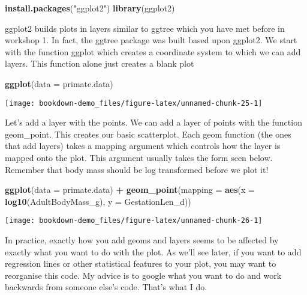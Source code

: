 \documentclass[]{book}
\newenvironment{Shaded}{\begin{snugshade}}{\end{snugshade}}
\newcommand{\KeywordTok}[1]{\textcolor[rgb]{0.13,0.29,0.53}{\textbf{#1}}}
\newcommand{\DataTypeTok}[1]{\textcolor[rgb]{0.13,0.29,0.53}{#1}}
\newcommand{\StringTok}[1]{\textcolor[rgb]{0.31,0.60,0.02}{#1}}
\newcommand{\OperatorTok}[1]{\textcolor[rgb]{0.81,0.36,0.00}{\textbf{#1}}}
\newcommand{\NormalTok}[1]{#1}
\begin{document}
\begin{Shaded}
\begin{Highlighting}[]
\KeywordTok{install.packages}\NormalTok{(}\StringTok{"ggplot2"}\NormalTok{)}
\KeywordTok{library}\NormalTok{(ggplot2)}
\end{Highlighting}
\end{Shaded}

ggplot2 builds plots in layers similar to ggtree which you have met
before in workshop 1. In fact, the ggtree package was built based upon
ggplot2. We start with the function ggplot which creates a coordinate
system to which we can add layers. This function alone just creates a
blank plot

\begin{Shaded}
\begin{Highlighting}[]
\KeywordTok{ggplot}\NormalTok{(}\DataTypeTok{data =}\NormalTok{ primate.data)}
\end{Highlighting}
\end{Shaded}

\begin{center}\texttt{[image: bookdown-demo\_files/figure-latex/unnamed-chunk-25-1]} \end{center}

Let's add a layer with the points. We can add a layer of points with the
function geom\_point. This creates our basic scatterplot. Each geom
function (the ones that add layers) takes a mapping argument which
controls how the layer is mapped onto the plot. This argument usually
takes the form seen below. Remember that body mass should be log
transformed before we plot it!

\begin{Shaded}
\begin{Highlighting}[]
\KeywordTok{ggplot}\NormalTok{(}\DataTypeTok{data =}\NormalTok{ primate.data) }\OperatorTok{+}
\StringTok{  }\KeywordTok{geom_point}\NormalTok{(}\DataTypeTok{mapping =} \KeywordTok{aes}\NormalTok{(}\DataTypeTok{x =} \KeywordTok{log10}\NormalTok{(AdultBodyMass_g), }\DataTypeTok{y =}\NormalTok{ GestationLen_d))}
\end{Highlighting}
\end{Shaded}

\begin{center}\texttt{[image: bookdown-demo\_files/figure-latex/unnamed-chunk-26-1]} \end{center}

In practice, exactly how you add geoms and layers seems to be affected
by exactly what you want to do with the plot. As we'll see later, if you
want to add regression lines or other statistical features to your plot,
you may want to reorganise this code. My advice is to google what you
want to do and work backwards from someone else's code. That's what I
do.
\end{document}

